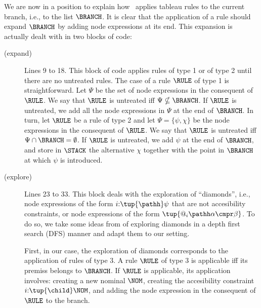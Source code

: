 \documentclass[10pt,a4paper]{amsart}
\theoremstyle{definition}
\theoremstyle{remark}
\begin{document}
We are now in a position to explain how~ applies tableau rules to the current branch, i.e., to the list $\BRANCH$.
It is clear that the application of a rule should expand $\BRANCH$ by adding node expressions at its end.
This expansion is actually dealt with in two blocks of code:
\begin{description}
    \item[(expand)]
        Lines 9 to 18.
        This block of code applies rules of type 1 or of type 2 until there are no untreated rules.
        The case of a rule $\RULE$ of type 1 is straightforward.
        Let $\Psi$ be the set of node expressions in the consequent of $\RULE$.
        We say that $\RULE$ is untreated iff $\Psi \nsubseteq \BRANCH$.
        If $\RULE$ is untreated, we add all the node expressions in $\Psi$ at the end of $\BRANCH$. 
        In turn, let $\RULE$ be a rule of type 2 and let $\Psi = \{\psi,\chi\}$ be the node expressions in the consequent of $\RULE$. 
        We say that $\RULE$ is untreated iff $\Psi \cap \BRANCH = \emptyset$.
        If $\RULE$ is untreated, we add $\psi$ at the end of $\BRANCH$, and store in $\STACK$ the alternative $\chi$ together with the point in $\BRANCH$ at which $\psi$ is introduced.

    \item[(explore)]
        Lines 23 to 33.
        This block deals with the exploration of ``diamonds'', i.e., node expressions of the form $i{:}\tup{\pathh}\psi$ that are not accesibility constraints, or node expressions of the form $\tup{@_i\pathh\alpha \cmpr \beta}$. 
        To do so, we take some ideas from \cite{Ladner77,Marx06} of exploring diamonds in a depth first search (DFS) manner and adapt them to our setting.
        
        First, in our case, the exploration of diamonds corresponds to the application of rules of type 3.
        A rule $\RULE$ of type 3 is applicable iff its premiss belongs to $\BRANCH$.
        If $\RULE$ is applicable, its application involves: creating a new nominal $\NOM$, creating the accesibility constraint $i{:}\tup{\child}\NOM$, and adding the node expression in the consequent of $\RULE$ to the branch.


\end{description}
\end{document}
